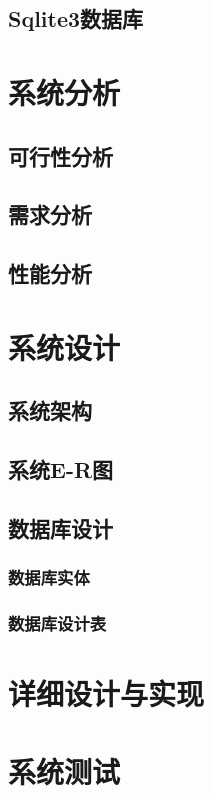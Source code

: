 \documentclass[12pt,a4paper]{article}%
\begin{document}
\subsection{Sqlite3数据库}

\newpage

\section{系统分析}
\subsection{可行性分析}
\subsection{需求分析}
\subsection{性能分析}

\newpage

\section{系统设计}
\subsection{系统架构}
\subsection{系统E-R图}
\subsection{数据库设计}
\subsubsection{数据库实体}
\subsubsection{数据库设计表}

\newpage

\section{详细设计与实现}

\newpage

\section{系统测试}
\end{document}
